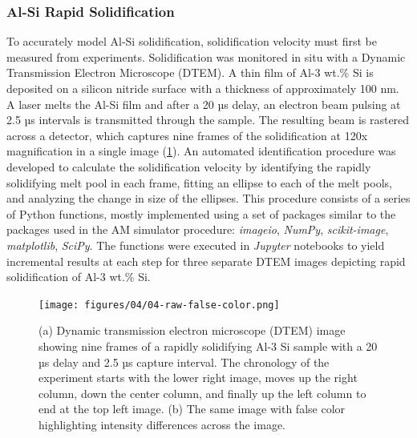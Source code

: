 \subsubsection{Al-Si Rapid Solidification}
To accurately model Al-Si solidification, solidification velocity must
first be measured from experiments. Solidification was monitored in situ
with a Dynamic Transmission Electron Microscope (DTEM).
A thin film of Al-3 wt.\% Si is deposited on a silicon nitride surface with a
thickness of approximately 100 nm.
A laser melts the Al-Si film and after a 20 µs delay, an electron beam
pulsing at 2.5 µs intervals is transmitted through the sample. The
resulting beam is rastered across a detector, which captures nine frames
of the solidification at 120x
magnification in a single image (\ref{fig/raw-false-color}).
An automated
identification procedure was developed to calculate the solidification
velocity by identifying the rapidly solidifying melt pool in each frame,
fitting an ellipse to each of the melt pools,
and analyzing the change in size of the ellipses. This procedure consists of
a series of Python functions, mostly implemented using a set of
packages similar to the packages used in the AM simulator procedure:
\textit{imageio}, \textit{NumPy}, \textit{scikit-image},
\textit{matplotlib}, \textit{SciPy}.
The functions were executed in \textit{Jupyter}
notebooks to yield incremental results at each step for three separate DTEM
images depicting rapid solidification of Al-3 wt.\% Si.

\begin{figure}[ht]
    \centering
    \texttt{[image: figures/04/04-raw-false-color.png]}
    \caption{
        \small{}
        (a) Dynamic transmission electron microscope (DTEM) image showing
        nine frames of a rapidly solidifying Al-3 Si sample with a 20 µs
        delay and 2.5 µs capture interval. The chronology of the experiment
        starts with the lower right image, moves up the right column, down
        the center column, and finally up the left column to end at the top
        left image.
        (b) The same image with false color highlighting intensity
        differences across the image.
    }
    \label{fig/raw-false-color}
\end{figure}

